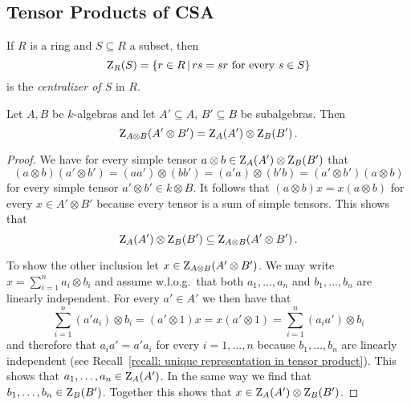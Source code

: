 \subsection{Tensor Products of CSA}


\begin{definition}
  If $R$ is a ring and $S \subseteq R$ a subset, then
  \[
      \centralizer_R(S)
    = \{
        r \in R
      \suchthat
        \text{$rs = sr$ for every $s \in S$}
      \}
  \]
  is the \emph{centralizer of $S$} in $R$.
\end{definition}


\begin{lemma}
  \label{lemma: centralizer componentwise}
  Let $A, B$ be $k$-algebras and let $A' \subseteq A$, $B' \subseteq B$ be subalgebras.
  Then
  \[
      \operatorname{Z}_{A \otimes B}(A' \otimes B')
    = \operatorname{Z}_A(A') \otimes \operatorname{Z}_B(B') \,.
  \]
\end{lemma}


\begin{proof}
  We have for every simple tensor $a \otimes b \in \operatorname{Z}_A(A') \otimes \operatorname{Z}_B(B')$ that
  \[
      (a \otimes b) (a' \otimes b')
    = (aa') \otimes (bb')
    = (a'a) \otimes (b'b)
    = (a' \otimes b')(a \otimes b)
  \]
  for every simple tensor $a' \otimes b' \in k \otimes B$.
  It follows that $(a \otimes b) x = x (a \otimes b)$ for every $x \in A' \otimes B'$ because every tensor is a sum of simple tensors.
  This shows that
  \[
              \operatorname{Z}_A(A') \otimes \operatorname{Z}_B(B')
    \subseteq \operatorname{Z}_{A \otimes B}(A' \otimes B') \,.
  \]
  
  To show the other inclusion let $x \in \operatorname{Z}_{A \otimes B}(A' \otimes B')$.
  We may write $x = \sum_{i=1}^n a_i \otimes b_i$ and assume w.l.o.g.\ that both $a_1, \dotsc, a_n$ and $b_1, \dotsc, b_n$ are linearly independent.
  For every $a' \in A'$ we then have that
  \[
      \sum_{i=1}^n (a' a_i) \otimes b_i
    = (a' \otimes 1) x
    = x (a' \otimes 1)
    = \sum_{i=1}^n (a_i a') \otimes b_i
  \]
  and therefore that $a_i a' = a' a_i$ for every $i = 1, \dotsc, n$ because $b_1, \dotsc, b_n$ are linearly independent (see Recall~\ref{recall: unique representation in tensor product}).
  This shows that $a_1, \dotsc, a_n \in \operatorname{Z}_{A}(A')$.
  In the same way we find that $b_1, \dotsc, b_n \in \operatorname{Z}_{B}(B')$.
  Together this shows that $x \in \operatorname{Z}_A(A') \otimes \operatorname{Z}_B(B')$.
\end{proof}


